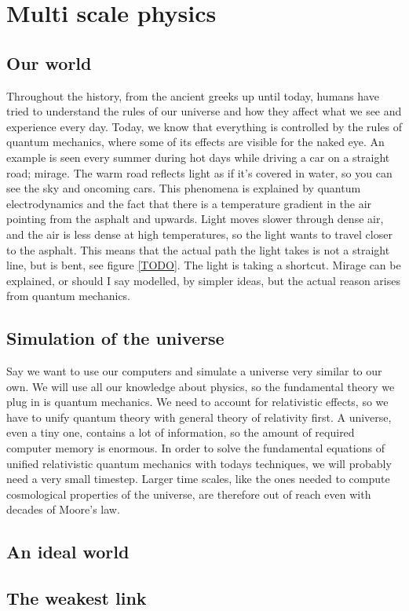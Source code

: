\section{Multi scale physics}

\subsection{Our world}
Throughout the history, from the ancient greeks up until today, humans have tried to understand the rules of our universe and how they affect what we see and experience every day. Today, we know that everything is controlled by the rules of quantum mechanics, where some of its effects are visible for the naked eye. An example is seen every summer during hot days while driving a car on a straight road; mirage. The warm road reflects light as if it's covered in water, so you can see the sky and oncoming cars. This phenomena is explained by quantum electrodynamics and the fact that there is a temperature gradient in the air pointing from the asphalt and upwards. Light moves slower through dense air, and the air is less dense at high temperatures, so the light wants to travel closer to the asphalt. This means that the actual path the light takes is not a straight line, but is bent, see figure \ref{TODO}. The light is taking a shortcut. Mirage can be explained, or should I say modelled, by simpler ideas, but the actual reason arises from quantum mechanics. 

\subsection{Simulation of the universe}
Say we want to use our computers and simulate a universe very similar to our own. We will use all our knowledge about physics, so the fundamental theory we plug in is quantum mechanics. We need to account for relativistic effects, so we have to unify quantum theory with general theory of relativity first. A universe, even a tiny one, contains a lot of information, so the amount of required computer memory is enormous. In order to solve the fundamental equations of unified relativistic quantum mechanics with todays techniques, we will probably need a very small timestep. Larger time scales, like the ones needed to compute cosmological properties of the universe, are therefore out of reach even with decades of Moore's law. 

\subsection{An ideal world}

\subsection{The weakest link}


